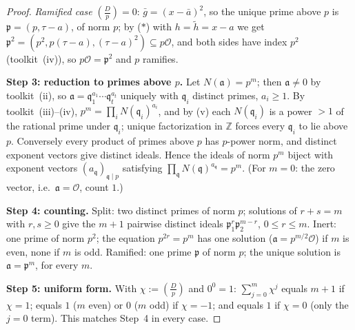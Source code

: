\begin{proof}
  \emph{Ramified case} $\left(\frac{D}{p}\right) = 0$: $\bar{g} = (x - \bar{a})^2$, so
  the unique prime above $p$ is $\mathfrak{p} = (p, \tau - a)$, of norm $p$; by ($*$)
  with $h = \tilde{h} = x - a$ we get
  $\mathfrak{p}^2 = (p^2, p(\tau - a), (\tau-a)^2) \subseteq p\mathcal{O}$, and both
  sides have index $p^2$ (toolkit~(iv)), so $p\mathcal{O} = \mathfrak{p}^2$ and $p$
  ramifies.

  \textbf{Step 3: reduction to primes above $p$.} Let $N(\mathfrak{a}) = p^m$; then
  $\mathfrak{a} \neq 0$ by toolkit~(ii), so
  $\mathfrak{a} = \mathfrak{q}_1^{a_1} \cdots \mathfrak{q}_t^{a_t}$ uniquely with
  $\mathfrak{q}_i$ distinct primes, $a_i \ge 1$. By toolkit~(iii)--(iv),
  $p^m = \prod_i N(\mathfrak{q}_i)^{a_i}$, and by (v) each $N(\mathfrak{q}_i)$ is a power
  $> 1$ of the rational prime under $\mathfrak{q}_i$; unique factorization in
  $\mathbb{Z}$ forces every $\mathfrak{q}_i$ to lie above $p$. Conversely every product
  of primes above $p$ has $p$-power norm, and distinct exponent vectors give distinct
  ideals. Hence the ideals of norm $p^m$ biject with exponent vectors
  $(a_{\mathfrak{q}})_{\mathfrak{q} \mid p}$ satisfying
  $\prod_{\mathfrak{q}} N(\mathfrak{q})^{a_{\mathfrak{q}}} = p^m$. (For $m = 0$: the zero
  vector, i.e.\ $\mathfrak{a} = \mathcal{O}$, count $1$.)

  \textbf{Step 4: counting.} Split: two distinct primes of norm $p$; solutions of
  $r + s = m$ with $r, s \ge 0$ give the $m+1$ pairwise distinct ideals
  $\mathfrak{p}_1^{r}\mathfrak{p}_2^{m-r}$, $0 \le r \le m$. Inert: one prime of norm
  $p^2$; the equation $p^{2r} = p^m$ has one solution ($\mathfrak{a} =
  p^{m/2}\mathcal{O}$) if $m$ is even, none if $m$ is odd. Ramified: one prime
  $\mathfrak{p}$ of norm $p$; the unique solution is $\mathfrak{a} = \mathfrak{p}^m$,
  for every $m$.

  \textbf{Step 5: uniform form.} With $\chi := \left(\frac{D}{p}\right)$ and $0^0 = 1$:
  $\sum_{j=0}^{m} \chi^j$ equals $m+1$ if $\chi = 1$; equals $1$ ($m$ even) or $0$
  ($m$ odd) if $\chi = -1$; and equals $1$ if $\chi = 0$ (only the $j = 0$ term). This
  matches Step~4 in every case.
\end{proof}
